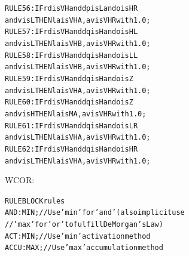 \documentclass[11pt,twoside]{article}
\begin{document}
\begin{multicols}{2}
\begin{scriptsize}
\begin{alltt}
RULE 56: IF rd is VH and dp is L and o is HR
    and v is L THEN la is VHA, av is VHR with 1.0;
RULE 57: IF rd is VH and dq is H and o is HL
    and v is L THEN la is VHB, av is VHR with 1.0;
RULE 58: IF rd is VH and dq is H and o is LL
    and v is L THEN la is VHB, av is VHR with 1.0;
RULE 59: IF rd is VH and dq is H and o is Z
    and v is L THEN la is VHA, av is VHR with 1.0;
RULE 60: IF rd is VH and dq is H and o is Z
    and v is H THEN la is MA, av is VHR with 1.0;
RULE 61: IF rd is VH and dq is H and o is LR
    and v is L THEN la is VHA, av is VHR with 1.0;
RULE 62: IF rd is VH and dq is H and o is HR
    and v is L THEN la is VHA, av is VHR with 1.0;
\end{alltt}
\end{scriptsize}
\vspace*{10pt}



\vspace*{10pt}
WCOR:
\begin{scriptsize}
\begin{alltt}
RULEBLOCK rules
AND  : MIN;			// Use 'min' for 'and' (also implicit use 
            //'max' for 'or' to fulfill DeMorgan's Law)
ACT  : MIN;			// Use 'min' activation method
ACCU : MAX;			// Use 'max' accumulation method


\end{alltt}
\end{scriptsize}
\end{multicols}
\end{document}
